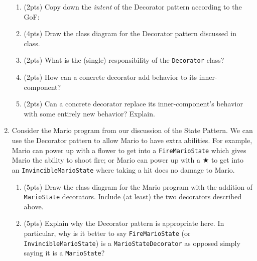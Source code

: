 \documentclass[11pt]{article}
\newlength{\up}\setlength{\up}{-\baselineskip}
\begin{document}
\begin{enumerate}
\begin{enumerate}
    \item (2pts) Copy down the \emph{intent} of the Decorator pattern according to the GoF:

    \vspace{1in}

    \item (4pts) Draw the class diagram for the Decorator pattern discussed in class.

    \vfill

    \item (2pts) What is the (single) responsibility of the \texttt{Decorator} class?

    \vspace{1in}

    \item (2pts) How can a concrete decorator add behavior to its inner-component? 

    \vspace{1in}

    \item (2pts) Can a concrete decorator replace its inner-component's behavior with some entirely new behavior? Explain.

    \vspace{1in}


  \end{enumerate}

\newpage

  \item Consider the Mario program from our discussion of the State Pattern. We can use the Decorator pattern to allow Mario to have extra abilities. For example, Mario can power up with a flower to get into a \texttt{FireMarioState} which gives Mario the ability to shoot fire; or Mario can power up with a $\bigstar$ to get into an \texttt{InvincibleMarioState} where taking a hit does no damage to Mario. 

  \begin{enumerate}

    \item (5pts) Draw the class diagram for the Mario program with the addition of \texttt{MarioState} decorators. Include (at least) the two decorators described above. 

    \vfill

    \item (5pts) Explain why the Decorator pattern is appropriate here. In particular, why is it better to say \texttt{FireMarioState} (or \texttt{InvincibleMarioState}) is a \texttt{MarioStateDecorator}  as opposed simply saying it is a \texttt{MarioState}?


\end{enumerate}
\end{enumerate}
\end{document}
